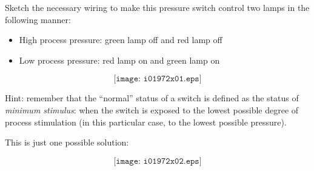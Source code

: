 

Sketch the necessary wiring to make this pressure switch control two lamps in the following manner:

\begin{itemize}
\item{} High process pressure: green lamp off and red lamp off
\item{} Low process pressure: red lamp on and green lamp on
\end{itemize}

$$\texttt{[image: i01972x01.eps]}$$

Hint: remember that the ``normal'' status of a switch is defined as the status of {\it minimum stimulus}: when the switch is exposed to the lowest possible degree of process stimulation (in this particular case, to the lowest possible pressure).








This is just one possible solution:

$$\texttt{[image: i01972x02.eps]}$$











